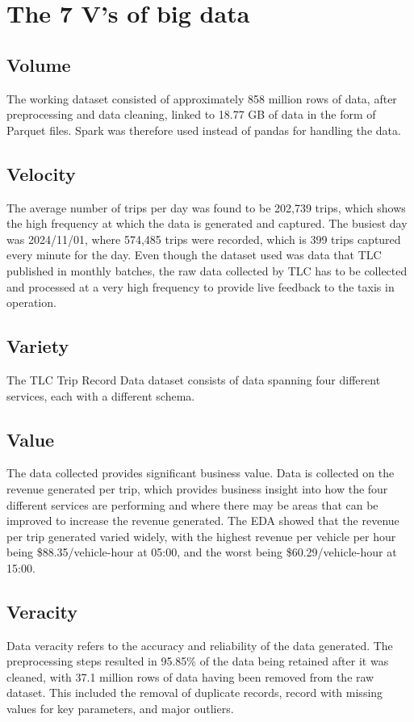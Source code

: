 \documentclass[conference]{IEEEtran}
\begin{document}
\section{The 7 V's of big data}
\subsection{Volume}
The working dataset consisted of approximately 858 million rows of data, after preprocessing and data cleaning, linked to 18.77 GB of data in the form of  Parquet files. Spark was therefore used instead of pandas for handling the data.

\subsection{Velocity}
The average number of trips per day was found to be 202,739 trips, which shows the high frequency at which the data is generated and captured. The busiest day was 2024/11/01, where 574,485 trips were recorded, which is 399 trips captured every minute for the day. Even though the dataset used was data that TLC published in monthly batches, the raw data collected by TLC has to be collected and processed at a very high frequency to provide live feedback to the taxis in operation. 

\subsection{Variety}
The TLC Trip Record Data dataset consists of data spanning four different services, each with a different schema.

\subsection{Value}
The data collected provides significant business value. Data is collected on the revenue generated per trip, which provides business insight into how the four different services are performing and where there may be areas that can be improved to increase the revenue generated. The EDA showed that the revenue per trip generated varied widely, with the highest revenue per vehicle per hour being \$88.35/vehicle-hour at 05:00, and the worst being \$60.29/vehicle-hour at 15:00.

\subsection{Veracity}
Data veracity refers to the accuracy and reliability of the data generated. The preprocessing steps resulted in 95.85\% of the data being retained after it was cleaned, with 37.1 million rows of data having been removed from the raw dataset. This included the removal of duplicate records, record with missing values for key parameters, and major outliers.
\end{document}
